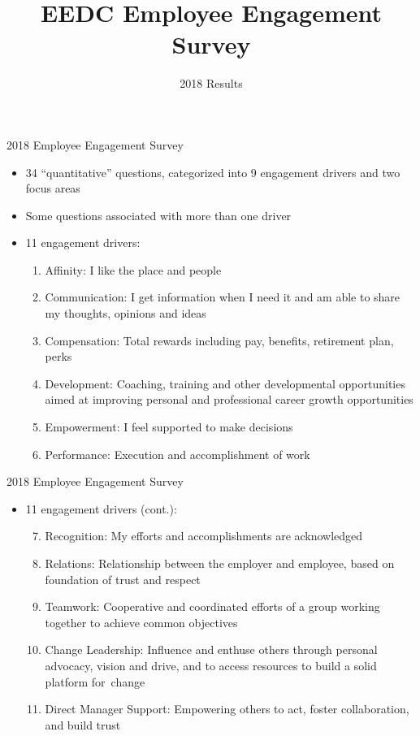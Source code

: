 \documentclass[handout]{beamer}
\title{EEDC Employee Engagement Survey}
\author{2018 Results}
\date{}
\providecommand{\tightlist}{%
  \setlength{\itemsep}{0pt}\setlength{\parskip}{0pt}}
\begin{document}
\frame{\titlepage}

\begin{frame}{2018 Employee Engagement Survey}
\protect\hypertarget{employee-engagement-survey}{}

\begin{itemize}
\tightlist
\item
  34 ``quantitative'' questions, categorized into 9 engagement drivers
  and two focus areas
\item
  Some questions associated with more than one driver
\item
  11 engagement drivers:

  \begin{enumerate}
  \tightlist
  \item
    Affinity: I like the place and people
  \item
    Communication: I get information when I need it and am able to share
    my thoughts, opinions and ideas
  \item
    Compensation: Total rewards including pay, benefits, retirement
    plan, perks
  \item
    Development: Coaching, training and other developmental
    opportunities aimed at improving personal and professional career
    growth opportunities
  \item
    Empowerment: I feel supported to make decisions
  \item
    Performance: Execution and accomplishment of work
  \end{enumerate}
\end{itemize}

\end{frame}

\begin{frame}{2018 Employee Engagement Survey}
\protect\hypertarget{employee-engagement-survey-1}{}

\begin{itemize}
\tightlist
\item
  11 engagement drivers (cont.):

  \begin{enumerate}
  \setcounter{enumi}{6}
  \tightlist
  \item
    Recognition: My efforts and accomplishments are acknowledged
  \item
    Relations: Relationship between the employer and employee, based on
    foundation of trust and respect
  \item
    Teamwork: Cooperative and coordinated efforts of a group working
    together to achieve common objectives
  \item
    Change Leadership: Influence and enthuse others through personal
    advocacy, vision and drive, and to access resources to build a solid
    platform for~change
  \item
    Direct Manager Support: Empowering others to act, foster
    collaboration, and build trust
  \end{enumerate}
\end{itemize}

\end{frame}
\end{document}
